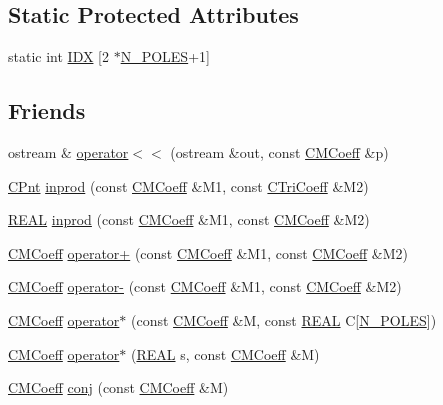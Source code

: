 \subsection*{Static Protected Attributes}
\begin{DoxyCompactItemize}
\item 
static int \hyperlink{classCMCoeff_ab1882e6a0df777b1acffadf55844dc92}{I\-D\-X} \mbox{[}2 $\ast$\hyperlink{mcoeff_8h_ac23f9c13c5d07d9ce386f7a830c35e5a}{N\-\_\-\-P\-O\-L\-E\-S}+1\mbox{]}
\end{DoxyCompactItemize}
\subsection*{Friends}
\begin{DoxyCompactItemize}
\item 
ostream \& \hyperlink{classCMCoeff_af219e14c617a293aad17ddf8f055db85}{operator$<$$<$} (ostream \&out, const \hyperlink{classCMCoeff}{C\-M\-Coeff} \&p)
\item 
\hyperlink{classCPnt}{C\-Pnt} \hyperlink{classCMCoeff_a095588ecdb857546a57e3f8f33ec983d}{inprod} (const \hyperlink{classCMCoeff}{C\-M\-Coeff} \&M1, const \hyperlink{classCTriCoeff}{C\-Tri\-Coeff} \&M2)
\item 
\hyperlink{util_8h_a5821460e95a0800cf9f24c38915cbbde}{R\-E\-A\-L} \hyperlink{classCMCoeff_a90c84c259a220e291cebf52d99560c61}{inprod} (const \hyperlink{classCMCoeff}{C\-M\-Coeff} \&M1, const \hyperlink{classCMCoeff}{C\-M\-Coeff} \&M2)
\item 
\hyperlink{classCMCoeff}{C\-M\-Coeff} \hyperlink{classCMCoeff_ab6e8a538afe3d4f8de9c1fa4904479ec}{operator+} (const \hyperlink{classCMCoeff}{C\-M\-Coeff} \&M1, const \hyperlink{classCMCoeff}{C\-M\-Coeff} \&M2)
\item 
\hyperlink{classCMCoeff}{C\-M\-Coeff} \hyperlink{classCMCoeff_a2f5f513c1e1864710b85443edbbc311a}{operator-\/} (const \hyperlink{classCMCoeff}{C\-M\-Coeff} \&M1, const \hyperlink{classCMCoeff}{C\-M\-Coeff} \&M2)
\item 
\hyperlink{classCMCoeff}{C\-M\-Coeff} \hyperlink{classCMCoeff_a794db3eaa0d9cf84e4c8ca1023e4f54a}{operator$\ast$} (const \hyperlink{classCMCoeff}{C\-M\-Coeff} \&M, const \hyperlink{util_8h_a5821460e95a0800cf9f24c38915cbbde}{R\-E\-A\-L} C\mbox{[}\hyperlink{mcoeff_8h_ac23f9c13c5d07d9ce386f7a830c35e5a}{N\-\_\-\-P\-O\-L\-E\-S}\mbox{]})
\item 
\hyperlink{classCMCoeff}{C\-M\-Coeff} \hyperlink{classCMCoeff_a4bebac156440468c712dfce37bc9fc7c}{operator$\ast$} (\hyperlink{util_8h_a5821460e95a0800cf9f24c38915cbbde}{R\-E\-A\-L} s, const \hyperlink{classCMCoeff}{C\-M\-Coeff} \&M)
\item 
\hyperlink{classCMCoeff}{C\-M\-Coeff} \hyperlink{classCMCoeff_a33f855dbf0c86d35853f618e3494db87}{conj} (const \hyperlink{classCMCoeff}{C\-M\-Coeff} \&M)
\end{DoxyCompactItemize}


